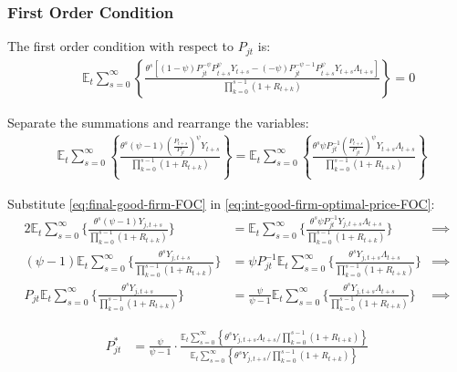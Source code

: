 \documentclass[
	12pt, 
	]{article}
\numberwithin{equation}{section}
\newcommand{\E}[1][t]{{\mathbb{E}_{#1}}}
\theoremstyle{definition}
\theoremstyle{plain}
\theoremstyle{plain}
\theoremstyle{plain}
\begin{document}

\subsubsection*{First Order Condition}

The first order condition with respect to $P_{jt}$ is:
\begin{align}
	& \quad \E \sum_{s=0}^{\infty} \left\{ \frac{\theta^s \left[ (1-\psi) P_{jt}^{-\psi} P_{t+s}^{\psi} Y_{t+s} - (-\psi) P_{jt}^{-\psi-1} P_{t+s}^{\psi} Y_{t+s} \Lambda_{t+s} \right] }{\prod_{k=0}^{s-1}(1+R_{t+k})} \right\} = 0 \nonumber
\end{align}


Separate the summations and rearrange the variables:
\begin{align}
\label{eq:int-good-firm-optimal-price-FOC}
	& \E \sum_{s=0}^{\infty} \left\{ \frac{\theta^s (\psi-1) \left( \frac{P_{t+s}} {P_{jt}} \right)^{\psi} Y_{t+s}} {\prod_{k=0}^{s-1} (1+R_{t+k})} \right\} = \E \sum_{s=0}^{\infty} \left\{ \frac{\theta^s \psi P_{jt}^{-1} \left( \frac{P_{t+s}} {P_{jt}} \right)^{\psi} Y_{t+s} \Lambda_{t+s} }{\prod_{k=0}^{s-1}(1+R_{t+k})} \right\}
\end{align}


Substitute \ref{eq:final-good-firm-FOC} in \ref{eq:int-good-firm-optimal-price-FOC}:
\begin{alignat}{2}
	\E \sum_{s=0}^{\infty} \Bigg\{ \frac{\theta^s (\psi-1) Y_{j,t+s}}{\prod_{k=0}^{s-1}(1+R_{t+k})} \Bigg\} &= \E \sum_{s=0}^{\infty} \Bigg\{ \frac{\theta^s \psi P_{jt}^{-1} Y_{j,t+s} \Lambda_{t+s}}{\prod_{k=0}^{s-1}(1+R_{t+k})}  \Bigg\} &\implies \nonumber \\
	(\psi-1) \E \sum_{s=0}^{\infty} \Bigg\{ \frac{\theta^s Y_{j,t+s}}{\prod_{k=0}^{s-1}(1+R_{t+k})} \Bigg\} &= \psi P_{jt}^{-1} \E \sum_{s=0}^{\infty} \Bigg\{ \frac{\theta^s Y_{j,t+s} \Lambda_{t+s}}{\prod_{k=0}^{s-1}(1+R_{t+k})}  \Bigg\} &\implies \nonumber \\
	P_{jt} \E \sum_{s=0}^{\infty} \Bigg\{ \frac{\theta^s Y_{j,t+s}}{\prod_{k=0}^{s-1}(1+R_{t+k})} \Bigg\} &= \frac{\psi}{\psi-1} \E \sum_{s=0}^{\infty} \Bigg\{ \frac{\theta^s Y_{j,t+s} \Lambda_{t+s}}{\prod_{k=0}^{s-1}(1+R_{t+k})}  \Bigg\} &\implies \nonumber
\end{alignat}

\vspace*{-1cm}

\begin{align}
\label{eq:int-good-firm-optimal-price-FOC-2}
	P_{jt}^\ast &= 
	\frac{\psi}{\psi-1} \cdot
	\frac{
		\E \sum_{s=0}^{\infty} \left\{ 
		\theta^s Y_{j,t+s} \Lambda_{t+s} / \prod_{k=0}^{s-1}(1+R_{t+k}) \right\} } {\E \sum_{s=0}^{\infty} \left\{
	\theta^s Y_{j,t+s} / \prod_{k=0}^{s-1}(1+R_{t+k}) \right\}}
\end{align}
\end{document}
